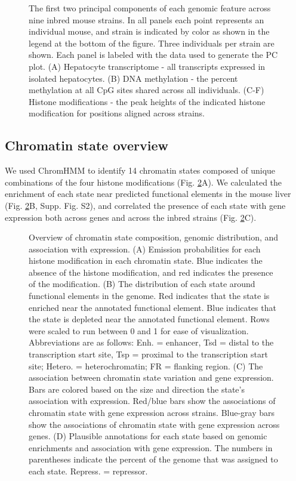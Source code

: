 \documentclass[
  11pt,
]{article}
\begin{document}
\begin{figure}[ht!]
\caption{The first two principal components of each genomic 
feature across nine inbred mouse strains. In all panels each 
point represents an individual mouse, and strain is indicated 
by color as shown in the legend at the bottom of the figure. 
Three individuals per strain are shown. Each panel is labeled 
with the data used to generate the PC plot. (A) Hepatocyte 
transcriptome - all transcripts expressed in isolated hepatocytes. 
(B) DNA methylation - the percent methylation at all CpG sites 
shared across all individuals. (C-F) Histone modifications - 
the peak heights of the indicated histone modification for
positions aligned across strains.}
\label{fig:pc_plots}
\end{figure}

\hypertarget{chromatin-state-overview}{%
\subsection{Chromatin state overview}\label{chromatin-state-overview}}

We used ChromHMM to identify 14 chromatin states composed of unique
combinations of the four histone modifications (Fig.
\ref{fig:state_overview}A). We calculated the enrichment of each state
near predicted functional elements in the mouse liver (Fig.
\ref{fig:state_overview}B, Supp. Fig. S2), and correlated the presence
of each state with gene expression both across genes and across the
inbred strains (Fig. \ref{fig:state_overview}C).

\begin{figure}[ht!]
\caption{Overview of chromatin state composition, genomic 
distribution, and association with expression. (A) Emission 
probabilities for each histone modification in each 
chromatin state. Blue indicates the absence of the histone
modification, and red indicates the presence of the 
modification. (B) The distribution of each state 
around functional elements in the genome. Red indicates that 
the state is enriched near the annotated functional element. 
Blue indicates that the state is depleted near the annotated 
functional element. Rows were scaled to run between 0 and 1
for ease of visualization. Abbreviations are as follows: 
Enh. = enhancer, Tsd = distal to the transcription start site, 
Tsp = proximal to the transcription start site; Hetero. = 
heterochromatin; FR = flanking region. (C) The association between 
chromatin state variation and gene expression. Bars are colored 
based on the size and direction the state's association with expression. 
Red/blue bars show the associations of chromatin state with gene
expression across strains. Blue-gray bars show the associations of
chromatin state with gene expression across genes. (D) Plausible 
annotations for each state based on genomic enrichments and association
with gene expression. The numbers in parentheses indicate the percent 
of the genome that was assigned to each state. Repress. = repressor.}
\label{fig:state_overview}
\end{figure}
\end{document}
